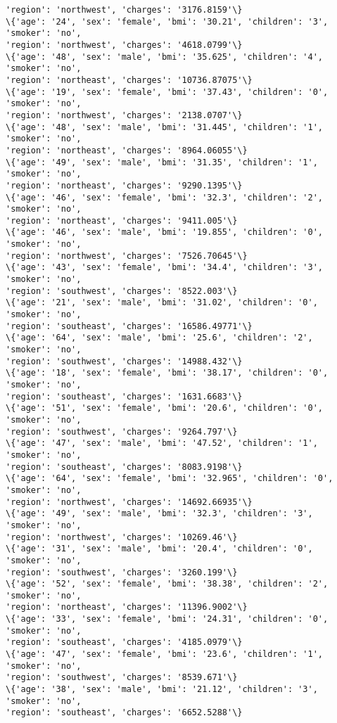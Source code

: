 \documentclass[11pt]{article}
\begin{document}
\begin{Verbatim}[commandchars=\\\{\}]
'region': 'northwest', 'charges': '3176.8159'\}
\{'age': '24', 'sex': 'female', 'bmi': '30.21', 'children': '3', 'smoker': 'no',
'region': 'northwest', 'charges': '4618.0799'\}
\{'age': '48', 'sex': 'male', 'bmi': '35.625', 'children': '4', 'smoker': 'no',
'region': 'northeast', 'charges': '10736.87075'\}
\{'age': '19', 'sex': 'female', 'bmi': '37.43', 'children': '0', 'smoker': 'no',
'region': 'northwest', 'charges': '2138.0707'\}
\{'age': '48', 'sex': 'male', 'bmi': '31.445', 'children': '1', 'smoker': 'no',
'region': 'northeast', 'charges': '8964.06055'\}
\{'age': '49', 'sex': 'male', 'bmi': '31.35', 'children': '1', 'smoker': 'no',
'region': 'northeast', 'charges': '9290.1395'\}
\{'age': '46', 'sex': 'female', 'bmi': '32.3', 'children': '2', 'smoker': 'no',
'region': 'northeast', 'charges': '9411.005'\}
\{'age': '46', 'sex': 'male', 'bmi': '19.855', 'children': '0', 'smoker': 'no',
'region': 'northwest', 'charges': '7526.70645'\}
\{'age': '43', 'sex': 'female', 'bmi': '34.4', 'children': '3', 'smoker': 'no',
'region': 'southwest', 'charges': '8522.003'\}
\{'age': '21', 'sex': 'male', 'bmi': '31.02', 'children': '0', 'smoker': 'no',
'region': 'southeast', 'charges': '16586.49771'\}
\{'age': '64', 'sex': 'male', 'bmi': '25.6', 'children': '2', 'smoker': 'no',
'region': 'southwest', 'charges': '14988.432'\}
\{'age': '18', 'sex': 'female', 'bmi': '38.17', 'children': '0', 'smoker': 'no',
'region': 'southeast', 'charges': '1631.6683'\}
\{'age': '51', 'sex': 'female', 'bmi': '20.6', 'children': '0', 'smoker': 'no',
'region': 'southwest', 'charges': '9264.797'\}
\{'age': '47', 'sex': 'male', 'bmi': '47.52', 'children': '1', 'smoker': 'no',
'region': 'southeast', 'charges': '8083.9198'\}
\{'age': '64', 'sex': 'female', 'bmi': '32.965', 'children': '0', 'smoker': 'no',
'region': 'northwest', 'charges': '14692.66935'\}
\{'age': '49', 'sex': 'male', 'bmi': '32.3', 'children': '3', 'smoker': 'no',
'region': 'northwest', 'charges': '10269.46'\}
\{'age': '31', 'sex': 'male', 'bmi': '20.4', 'children': '0', 'smoker': 'no',
'region': 'southwest', 'charges': '3260.199'\}
\{'age': '52', 'sex': 'female', 'bmi': '38.38', 'children': '2', 'smoker': 'no',
'region': 'northeast', 'charges': '11396.9002'\}
\{'age': '33', 'sex': 'female', 'bmi': '24.31', 'children': '0', 'smoker': 'no',
'region': 'southeast', 'charges': '4185.0979'\}
\{'age': '47', 'sex': 'female', 'bmi': '23.6', 'children': '1', 'smoker': 'no',
'region': 'southwest', 'charges': '8539.671'\}
\{'age': '38', 'sex': 'male', 'bmi': '21.12', 'children': '3', 'smoker': 'no',
'region': 'southeast', 'charges': '6652.5288'\}

\end{Verbatim}
\end{document}
